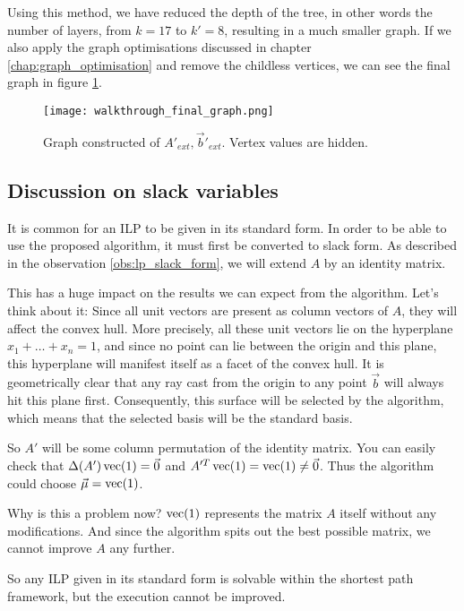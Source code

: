 Using this method, we have reduced the depth of the tree, in other words the number of layers, from $k=17$ to $k'=8$, resulting in a much smaller graph. If we also apply the graph optimisations discussed in chapter \ref{chap:graph_optimisation} and remove the childless vertices, we can see the final graph in figure \ref{fig:walkthrough_final_graph}.
\begin{figure}
    \centering
    \texttt{[image: walkthrough\_final\_graph.png]}
    \caption{\label{fig:walkthrough_final_graph} Graph constructed of $A'_{ext}, \vec b'_{ext}$. Vertex values are hidden.}
\end{figure}

\subsection{Discussion on slack variables}
It is common for an ILP to be given in its standard form. In order to be able to use the proposed algorithm, it must first be converted to slack form. As described in the observation \ref{obs:lp_slack_form}, we will extend $A$ by an identity matrix.

This has a huge impact on the results we can expect from the algorithm. Let's think about it: Since all unit vectors are present as column vectors of $A$, they will affect the convex hull. More precisely, all these unit vectors lie on the hyperplane $x_1 + \dots + x_n = 1$, and since no point can lie between the origin and this plane, this hyperplane will manifest itself as a facet of the convex hull. It is geometrically clear that any ray cast from the origin to any point $\vec b$ will always hit this plane first. Consequently, this surface will be selected by the algorithm, which means that the selected basis will be the standard basis.

So $A'$ will be some column permutation of the identity matrix. You can easily check that $\Delta(A')\operatorname{vec}(1) = \vec 0$ and $A'^T\operatorname{vec}(1) = \operatorname{vec}(1) \neq \vec0$. Thus the algorithm could choose $\vec\mu = \operatorname{vec}(1)$.

Why is this a problem now? $\operatorname{vec}(1)$ represents the matrix $A$ itself without any modifications. And since the algorithm spits out the best possible matrix, we cannot improve $A$ any further.

So any ILP given in its standard form is solvable within the shortest path framework, but the execution cannot be improved.